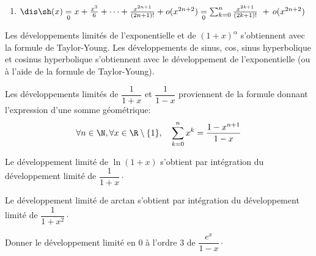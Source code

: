 \documentclass[a4paper,10pt]{report}
\begin{document}
\begin{center}
{\begin{minipage}[h][12.5cm][t]{14.5cm}
\begin{enumerate}
$$	\item[$$] $\dis\ch(x)\underset{0}{=}1+\frac{x^2}{2}+\dots+\frac{x^{2n}}{(2n)!}+o(x^{2n+1})\underset{0}{=}\sum_{k=0}^n\frac{x^{2k}}{(2k)!}~+\,o(x^{2n+1})$\label{DLch}
	\item[$$] $\dis \sh(x)\underset{0}{=}x+\frac{x^3}{6}+\dots+\frac{x^{2n+1}}{(2n+1)!}+o(x^{2n+2})\underset{0}{=}\sum_{k=0}^n\frac{x^{2k+1}}{(2k+1)!}~+\,o(x^{2n+2})$\label{DLsh}
\end{enumerate}
 \end{minipage}}
\end{center}

\medskip

\begin{rems}
\item Les développements limités de l'exponentielle et de $(1+x)^{\alpha}$ s'obtiennent avec la formule de Taylor-Young. Les développements de sinus, cos, sinus hyperbolique et cosinus hyperbolique s'obtiennent avec le développement de l'exponentielle (ou à l'aide de la formule de Taylor-Young).  
\item Les développements limités de $\dfrac{1}{1+x}$ et $\dfrac{1}{1-x}$ proviennent de la formule donnant l'expression d'une somme géométrique:
\[
\forall n\in\N,\forall x\in\R \setminus \lbrace 1 \rbrace, \quad \sum_{k=0}^n x^k=\frac{1-x^{n+1}}{1-x}
\]
\item Le développement limité de $\ln(1+x)$ s'obtient par intégration du développement limité de $\dfrac{1}{1+x}\cdot$
\item Le développement limité de arctan s'obtient par intégration du développement limité de $\dfrac{1}{1+x^2} \cdot$
\end{rems}

\begin{exa} Donner le développement limité en $0$ à l'ordre $3$ de $\dfrac{e^x}{1-x} \cdot$
\end{exa}
\end{document}
